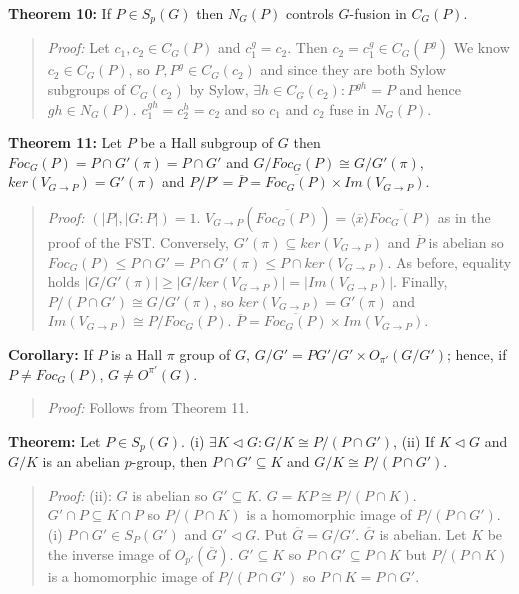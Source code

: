 {\bf Theorem 10:}  
If $P \in S_p(G)$ then $N_G(P)$ controls $G$-fusion in $C_G(P)$.
\begin{quote}
\emph{Proof:}  
Let $c_1 , c_2 \in C_G(P)$ and $c_1^g=c_2$.  Then $c_2 = c_1^g \in C_G(P^g)$
We know $c_2 \in C_G(P)$, so $P, P^g \in C_G(c_2)$ and since they are both
Sylow subgroups of $C_G(c_2)$ by Sylow, $\exists h \in C_G(c_2): P^{gh}=P$ and
hence $gh \in N_G(P)$.  $c_1^{gh}= c_2^h= c_2$ and so $c_1$ and $c_2$ fuse in $N_G(P)$.
\end{quote}
{\bf Theorem 11:}  Let  $P$ be a Hall subgroup of $G$ then $Foc_G(P) = P \cap G'(\pi)=P \cap G'$ and
$G/Foc_G(P) \cong G/G'(\pi)$, $ker(V_{G \rightarrow P}) = G'(\pi)$ and
$P/P' = {\overline P} = {\overline {Foc_G(P)}} \times Im(V_{G \rightarrow P})$.
\begin{quote}
\emph{Proof:}  $(|P|,|G:P|) = 1$.
$V_{G \rightarrow P} ({\overline {Foc_G(P)}}) = \langle {\overline x} \rangle {\overline {Foc_G(P)}}$ as in the
proof of the FST.  Conversely, $G'(\pi) \subseteq ker(V_{G \rightarrow P})$ and ${\overline P}$ is abelian so
$Foc_G(P) \leq P \cap G' = P \cap G'(\pi) \leq P \cap ker(V_{G \rightarrow P})$.  As before, equality holds 
$|G/G'(\pi)| \geq |G/ker(V_{G \rightarrow P})| = |Im(V_{G\rightarrow P})|$.
Finally, $P/(P \cap G') \cong G/G'(\pi)$,
so $ker(V_{G \rightarrow P}) = G'(\pi)$ and $Im(V_{G \rightarrow P}) \cong P/Foc_G(P)$.
${\overline P} = {\overline {Foc_G(P)}} \times Im(V_{G \rightarrow P})$.
\end{quote}
{\bf Corollary:} If $P$ is a Hall $\pi$
group of $G$, $G/G'= PG'/G' \times O_{\pi'}(G/G')$; hence, if $P \ne Foc_G(P)$,
$G \ne O^{\pi'}(G)$.
\begin{quote}
\emph{Proof:}  
Follows from Theorem 11.
\end{quote}
{\bf Theorem:}  Let $P \in S_p(G)$.  (i) $\exists K \lhd G: G/K \cong P/(P \cap G')$, (ii) If
$K \lhd G$ and $G/K$ is an abelian $p$-group, then $P \cap G' \subseteq K$ and $G/K \cong P/(P \cap G')$.
\begin{quote}
\emph{Proof:}
(ii): $G$ is abelian so $G' \subseteq K$.  $G=KP \cong P/(P \cap K)$. $G' \cap P \subseteq K \cap P$ so
$P/(P \cap K)$ is a homomorphic image of $P/(P \cap G')$. \\
(i) $P \cap G' \in S_P(G')$ and $G' \lhd G$.  Put ${\overline G} = G/G'$. ${\overline G}$ is abelian.  Let
$K$ be the inverse image of $O_{p'}({\overline G})$.  $G' \subseteq K$ so $P \cap G' \subseteq P \cap K$
but $P/(P \cap K)$ is a homomorphic image of $P/(P \cap G')$ so $P \cap K = P \cap G'$.
\end{quote}
